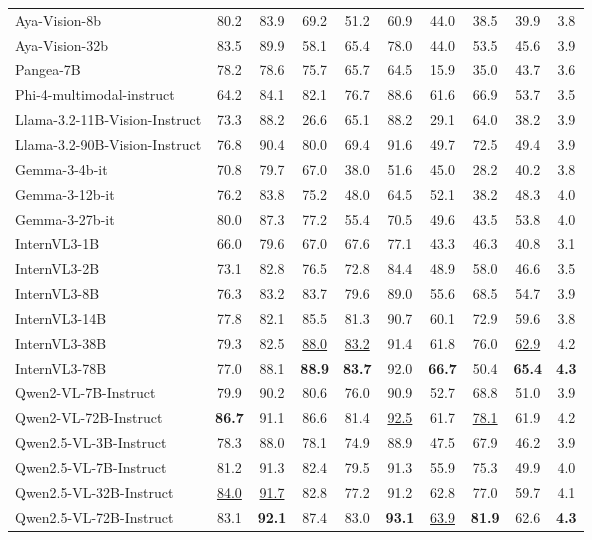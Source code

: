 \begin{table*}[t]
\begin{adjustbox}{max width=\linewidth}
\begin{tabular}{lccccccccc}
Aya-Vision-8b & 80.2 & 83.9 & 69.2 & 51.2 & 60.9 & 44.0 & 38.5 & 39.9 & 3.8 \\
Aya-Vision-32b & 83.5 & 89.9 & 58.1 & 65.4 & 78.0 & 44.0 & 53.5 & 45.6 & 3.9 \\
Pangea-7B & 78.2 & 78.6 & 75.7 & 65.7 & 64.5 & 15.9 & 35.0 & 43.7 & 3.6 \\
Phi-4-multimodal-instruct & 64.2 & 84.1 & 82.1 & 76.7 & 88.6 & 61.6 & 66.9 & 53.7 & 3.5 \\
Llama-3.2-11B-Vision-Instruct & 73.3 & 88.2 & 26.6 & 65.1 & 88.2 & 29.1 & 64.0 & 38.2 & 3.9 \\
Llama-3.2-90B-Vision-Instruct & 76.8 & 90.4 & 80.0 & 69.4 & 91.6 & 49.7 & 72.5 & 49.4 & 3.9 \\
Gemma-3-4b-it & 70.8 & 79.7 & 67.0 & 38.0 & 51.6 & 45.0 & 28.2 & 40.2 & 3.8 \\
Gemma-3-12b-it & 76.2 & 83.8 & 75.2 & 48.0 & 64.5 & 52.1 & 38.2 & 48.3 & 4.0 \\
Gemma-3-27b-it & 80.0 & 87.3 & 77.2 & 55.4 & 70.5 & 49.6 & 43.5 & 53.8 & 4.0 \\
InternVL3-1B & 66.0 & 79.6 & 67.0 & 67.6 & 77.1 & 43.3 & 46.3 & 40.8 & 3.1 \\
InternVL3-2B & 73.1 & 82.8 & 76.5 & 72.8 & 84.4 & 48.9 & 58.0 & 46.6 & 3.5 \\
InternVL3-8B & 76.3 & 83.2 & 83.7 & 79.6 & 89.0 & 55.6 & 68.5 & 54.7 & 3.9 \\
InternVL3-14B & 77.8 & 82.1 & 85.5 & 81.3 & 90.7 & 60.1 & 72.9 & 59.6 & 3.8 \\
InternVL3-38B & 79.3 & 82.5 & \underline{88.0} & \underline{83.2} & 91.4 & 61.8 & 76.0 & \underline{62.9} & 4.2 \\
InternVL3-78B & 77.0 & 88.1 & \textbf{88.9} & \textbf{83.7} & 92.0 & \textbf{66.7} & 50.4 & \textbf{65.4} & \textbf{4.3} \\
Qwen2-VL-7B-Instruct & 79.9 & 90.2 & 80.6 & 76.0 & 90.9 & 52.7 & 68.8 & 51.0 & 3.9 \\
Qwen2-VL-72B-Instruct & \textbf{86.7} & 91.1 & 86.6 & 81.4 & \underline{92.5} & 61.7 & \underline{78.1} & 61.9 & 4.2 \\
Qwen2.5-VL-3B-Instruct & 78.3 & 88.0 & 78.1 & 74.9 & 88.9 & 47.5 & 67.9 & 46.2 & 3.9 \\
Qwen2.5-VL-7B-Instruct & 81.2 & 91.3 & 82.4 & 79.5 & 91.3 & 55.9 & 75.3 & 49.9 & 4.0 \\
Qwen2.5-VL-32B-Instruct & \underline{84.0} & \underline{91.7} & 82.8 & 77.2 & 91.2 & 62.8 & 77.0 & 59.7 & 4.1 \\
Qwen2.5-VL-72B-Instruct & 83.1 & \textbf{92.1} & 87.4 & 83.0 & \textbf{93.1} & \underline{63.9} & \textbf{81.9} & 62.6 & \textbf{4.3} \\
\bottomrule
\end{tabular}
\end{adjustbox}
\end{table*}
\endgroup